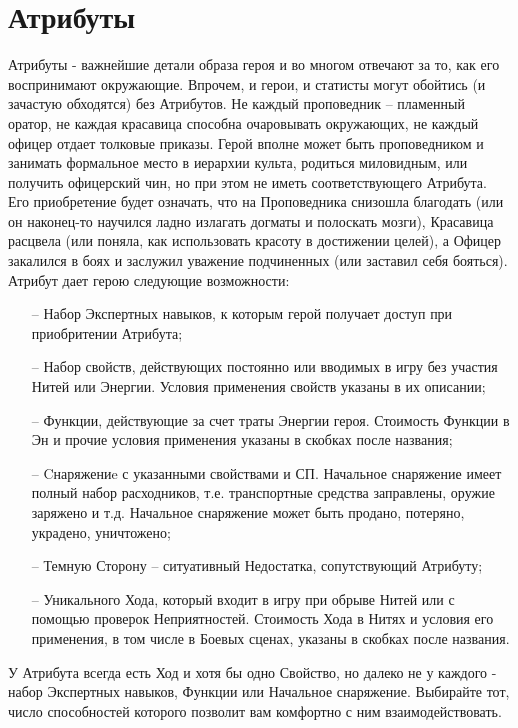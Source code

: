 \section{Атрибуты}



Атрибуты - важнейшие детали образа героя и во многом отвечают за то, как его воспринимают окружающие. 
\newline Впрочем, и герои, и статисты могут обойтись (и зачастую обходятся) без Атрибутов. Не каждый проповедник – пламенный оратор, не каждая красавица способна очаровывать окружающих, не каждый офицер отдает толковые приказы. Герой вполне может быть проповедником и занимать формальное место в иерархии культа, родиться миловидным, или получить офицерский чин, но при этом не иметь соответствующего Атрибута. Его приобретение будет означать, что на Проповедника снизошла благодать (или он наконец-то научился ладно излагать догматы и полоскать мозги), Красавица расцвела (или поняла, как использовать красоту в достижении целей), а Офицер закалился в боях и заслужил уважение подчиненных (или заставил себя бояться).
Атрибут дает герою следующие возможности:
\begin{itemize}
    \item[--] Набор Экспертных навыков, к которым герой получает доступ при приобритении Атрибута;
    \item[--] Набор свойств, действующих постоянно или вводимых в игру без участия Нитей или Энергии. Условия применения свойств указаны в их описании;
    \item[--] Функции, действующие за счет траты Энергии героя. Стоимость Функции в Эн и прочие условия применения указаны в скобках после названия;
    \item[--] Cнаряжениe с указанными свойствами и СП. Начальное снаряжение имеет полный набор расходников, т.е. транспортные средства заправлены, оружие заряжено и т.д. Начальное снаряжение может быть продано, потеряно, украдено, уничтожено;
    \item[--] Темную Сторону – ситуативный Недостатка, сопутствующий Атрибуту;
    \item[--] Уникального Хода, который входит в игру при обрыве Нитей или с помощью проверок Неприятностей. Стоимость Хода в Нитях и условия его применения, в том числе в Боевых сценах, указаны в скобках после названия.
\end{itemize}

\begin{tcolorbox}
    У Атрибута всегда есть Ход и хотя бы одно Свойство, но далеко не у каждого - набор Экспертных навыков, Функции или Начальное снаряжение. Выбирайте тот, число способностей которого позволит вам комфортно с ним взаимодействовать.
\end{tcolorbox}

